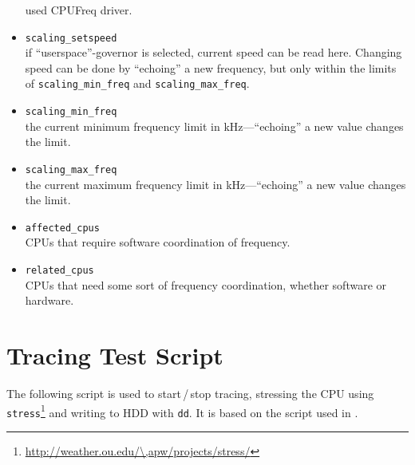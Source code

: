 \begin{multicols}{2}
\begin{itemize}
	used CPUFreq driver.
\item \lstinline!scaling_setspeed!\\
	if ``userspace''-governor is selected, current speed can be read here. Changing speed can be done by ``echoing'' a new frequency, but only within the limits of \lstinline!scaling_min_freq! and \lstinline!scaling_max_freq!.
\item \lstinline!scaling_min_freq!\\
	the current minimum frequency limit in kHz---``echoing'' a new value changes the limit.
\item \lstinline!scaling_max_freq!\\
	the current maximum frequency limit in kHz---``echoing'' a new value changes the limit. 
\item \lstinline!affected_cpus!\\
	CPUs that require software coordination of frequency.
\item \lstinline!related_cpus!\\
	CPUs that need some sort of frequency coordination, whether software or hardware.
\end{itemize}
\end{multicols}

%
%
\section*{Tracing Test Script}
\label{sec:stress}
The following script is used to start\,/\,stop tracing, stressing the CPU using \lstinline!stress!\footnote{\url{http://weather.ou.edu/\,apw/projects/stress/}} and writing to HDD with \lstinline!dd!. It is based on the script used in \cite{krempel}.


%
%
\newpage
